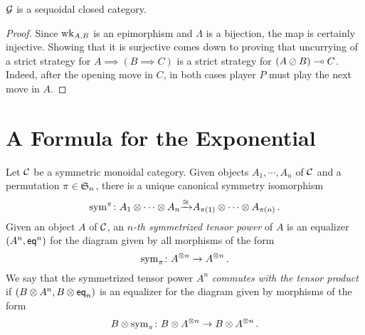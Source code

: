 \documentclass[11pt]{report}
\begin{document}
\begin{proposition}
  $\G$ is a sequoidal closed category.
\end{proposition}
\begin{proof}
  Since $\wk_{A,B}$ is an epimorphism and $\Lambda$ is a bijection, the map is certainly injective.  
  Showing that it is surjective comes down to proving that uncurrying of a strict strategy for $A\implies (B \implies C)$ is a strict strategy for $(A\sequoid B) \implies C$.
  Indeed, after the opening move in $C$, in both cases player $P$ must play the next move in $A$.
\end{proof}

\section{A Formula for the Exponential}

\begin{definition}
  Let $\C$ be a symmetric monoidal category.  
  Given objects $A_1,\cdots,A_n$ of $\C$ and a permutation $\pi\in \S_n$, there is a unique canonical symmetry isomorphism
  \[
    \sym^\pi \from A_1 \tensor \cdots \tensor A_n \toisom A_{\pi(1)} \tensor \cdots \tensor A_{\pi(n)}\,.
    \]
  Given an object $A$ of $\C$, an \emph{$n$-th symmetrized tensor power} of $A$ is an equalizer $(A^n,\eq^n)$ for the diagram given by all morphisms of the form
  \[
    \sym_\pi \from A ^{\tensor n} \to A ^{\tensor n}\,.
    \]
  We say that the symmetrized tensor power $A^n$ \emph{commutes with the tensor product} if $(B\tensor A^n,B\tensor \eq_n)$ is an equalizer for the diagram given by morphisms of the form
  \[
    B\tensor\sym_\pi \from B\tensor A ^{\tensor n} \to B\tensor A ^{\tensor n}\,.
    \]
\end{definition}
\end{document}

